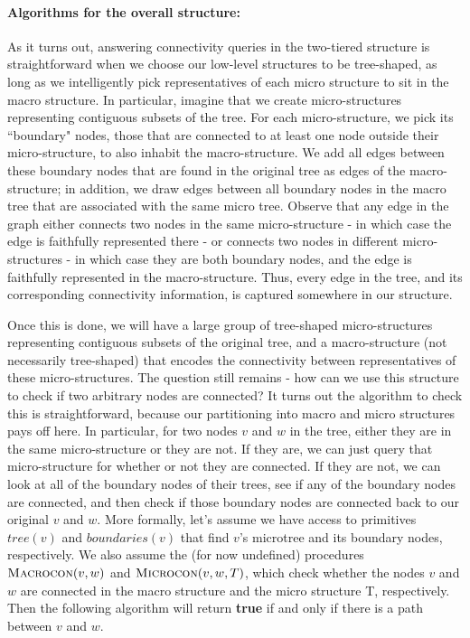 \documentclass{article}
\begin{document}
\paragraph{Algorithms for the overall structure:}
As it turns out, answering connectivity queries in the two-tiered structure is straightforward when we choose our low-level structures to be tree-shaped, as long as we intelligently pick representatives of each micro structure to sit in the macro structure. In particular, imagine that we create micro-structures representing contiguous subsets of the tree. For each micro-structure, we pick its ``boundary" nodes, those that are connected to at least one node outside their micro-structure, to also inhabit the macro-structure. We add all edges between these boundary nodes that are found in the original tree as edges of the macro-structure; in addition, we draw edges between all boundary nodes in the macro tree that are associated with the same micro tree. Observe that any edge in the graph either connects two nodes in the same micro-structure - in which case the edge is faithfully represented there - or connects two nodes in different micro-structures - in which case they are both boundary nodes, and the edge is faithfully represented in the macro-structure. Thus, every edge in the tree, and its corresponding connectivity information, is captured somewhere in our structure.

Once this is done, we will have a large group of tree-shaped micro-structures representing contiguous subsets of the original tree, and a macro-structure (not necessarily tree-shaped) that encodes the connectivity between representatives of these micro-structures. The question still remains - how can we use this structure to check if two arbitrary nodes are connected? It turns out the algorithm to check this is straightforward, because our partitioning into macro and micro structures pays off here. In particular, for two nodes $v$ and $w$ in the tree, either they are in the same micro-structure or they are not. If they are, we can just query that micro-structure for whether or not they are connected. If they are not, we can look at all of the boundary nodes of their trees, see if any of the boundary nodes are connected, and then check if those boundary nodes are connected back to our original $v$ and $w.$ More formally, let's assume we  have access to primitives $tree(v)$ and $boundaries(v)$ that find $v$'s microtree and its boundary nodes, respectively. We also assume the (for now undefined) procedures $\textsc{Macrocon}(v,w)$ and $\textsc{Microcon}(v,w,T)$, which check whether the nodes $v$ and $w$ are connected in the macro structure and the micro structure T, respectively. Then the following algorithm will return \textbf{true} if and only if there is a path between $v$ and $w.$
\end{document}
